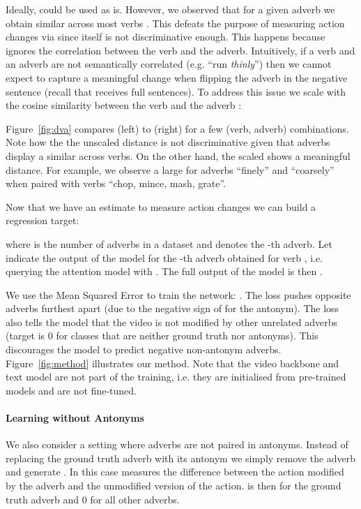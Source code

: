 \documentclass[10pt,twocolumn,letterpaper]{article}
\newcommand{\fparagraph}[1]{\paragraph{#1}}
\begin{document}
 

Ideally,  could be used as is. 
However, we observed that for a given adverb  we obtain similar  across most verbs . This defeats the purpose of measuring action changes via  since  itself is not discriminative enough. This 
happens 
because  ignores the correlation between the verb and the adverb. Intuitively, if a verb and an adverb are not semantically correlated (e.g. ``run \textit{thinly}'') then we cannot expect to capture a meaningful change 
when flipping the adverb in the negative sentence  (recall that  receives full sentences).
To address this issue we scale  with the cosine similarity between the verb  and the adverb :

\vspace{-15pt}


\noindent Figure~\ref{fig:dva} compares  (left) to  (right) for a few (verb, adverb) combinations. 
Note how the the unscaled distance  is not discriminative given that adverbs display a similar  across verbs. On the other hand, the scaled  shows a meaningful distance. For example, we observe a large  for adverbs ``finely'' and ``coarsely'' when paired with verbs ``chop, mince, mash, grate''. 

Now that we have an estimate to measure action changes we can build a regression target:


\noindent where  is the number of adverbs in a dataset and  denotes the -th adverb. 
Let  indicate the output of the model for the -th adverb obtained for verb , i.e. querying the attention model with .
The full output of the model is then . 

We use the Mean Squared Error to train the network: .
The loss pushes opposite adverbs furthest apart (due to the negative sign of  for the antonym). 
The loss also tells the model that the video is not modified by other unrelated adverbs (target is 0 for classes that are neither ground truth nor antonyms). This discourages the model to predict negative non-antonym adverbs.
Figure~\ref{fig:method} illustrates our method. Note that the video backbone and text model are not part of the training, i.e. they are 
initialised from pre-trained models and are not fine-tuned.

\vspace{-10pt}

\fparagraph{Learning without Antonyms} We also consider a setting where adverbs are not paired in antonyms. Instead of replacing the ground truth 
adverb with its antonym we simply remove the adverb and generate . In this case  measures the difference between the action modified by the adverb and the unmodified version of the action.  is then  for the ground truth adverb and 0 for all other adverbs. 
\end{document}
